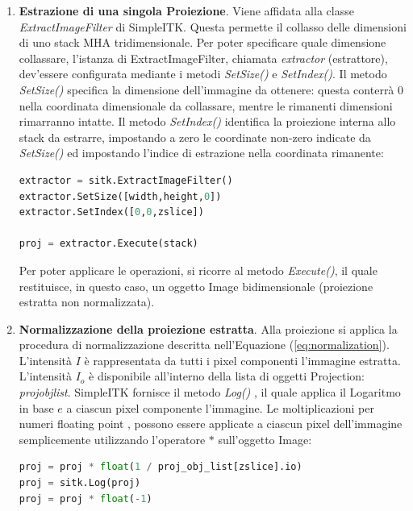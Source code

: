 \documentclass[a4paper,12pt, doubleside]{report}
\begin{document}
                \begin{enumerate}
                    \item \textbf{Estrazione di una singola Proiezione}. Viene affidata alla classe \textit{ExtractImageFilter} \cite{sitk-estractor} di SimpleITK. Questa permette il collasso delle dimensioni di uno stack MHA tridimensionale. Per poter specificare quale dimensione collassare, l'istanza di ExtractImageFilter, chiamata \textit{extractor} (estrattore), dev'essere configurata mediante i metodi \textit{SetSize()} e \textit{SetIndex()}. Il metodo \textit{SetSize()} specifica la dimensione dell'immagine da ottenere: questa conterrà $0$ nella coordinata dimensionale da collassare, mentre le rimanenti dimensioni rimarranno intatte. Il metodo \textit{SetIndex()} identifica la proiezione interna allo stack da estrarre, impostando a zero le coordinate non-zero indicate da \textit{SetSize()} ed impostando l'indice di estrazione nella coordinata rimanente:
                    
                    \begin{lstlisting}[language=python, frame=bt]
extractor = sitk.ExtractImageFilter()
extractor.SetSize([width,height,0])
extractor.SetIndex([0,0,zslice])

proj = extractor.Execute(stack)
                    \end{lstlisting} 
                    
                    Per poter applicare le operazioni, si ricorre al metodo \textit{Execute()}, il quale restituisce, in questo caso, un oggetto Image bidimensionale (proiezione estratta non normalizzata).
                    
                    \item \textbf{Normalizzazione della proiezione estratta}. Alla proiezione si applica la procedura di normalizzazione descritta nell'Equazione (\ref{eq:normalization}). L'intensità $I$ è rappresentata da tutti i pixel componenti l'immagine estratta. L'intensità $I_o$ è disponibile all'interno della lista di oggetti Projection: \textit{proj\textunderscore obj\textunderscore list}. SimpleITK fornisce il metodo \textit{Log()} \cite{sitk-log}, il quale applica il Logaritmo in base $e$ a ciascun pixel componente l'immagine. 
                    Le moltiplicazioni per numeri floating point \cite{python-floating-point}, possono essere applicate a ciascun pixel dell'immagine semplicemente utilizzando l'operatore $*$ \cite{sitk-star-operator} sull'oggetto Image:
                    \begin{lstlisting}[language=python, frame=bt]
proj = proj * float(1 / proj_obj_list[zslice].io)
proj = sitk.Log(proj)
proj = proj * float(-1)
                    \end{lstlisting}
                    

\end{enumerate}
\end{document}
